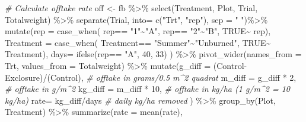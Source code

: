 \documentclass[
]{article}
\newenvironment{Shaded}{\begin{snugshade}}{\end{snugshade}}
\newcommand{\AttributeTok}[1]{\textcolor[rgb]{0.77,0.63,0.00}{#1}}
\newcommand{\CommentTok}[1]{\textcolor[rgb]{0.56,0.35,0.01}{\textit{#1}}}
\newcommand{\ConstantTok}[1]{\textcolor[rgb]{0.00,0.00,0.00}{#1}}
\newcommand{\DecValTok}[1]{\textcolor[rgb]{0.00,0.00,0.81}{#1}}
\newcommand{\FunctionTok}[1]{\textcolor[rgb]{0.00,0.00,0.00}{#1}}
\newcommand{\NormalTok}[1]{#1}
\newcommand{\OtherTok}[1]{\textcolor[rgb]{0.56,0.35,0.01}{#1}}
\newcommand{\SpecialCharTok}[1]{\textcolor[rgb]{0.00,0.00,0.00}{#1}}
\newcommand{\StringTok}[1]{\textcolor[rgb]{0.31,0.60,0.02}{#1}}
\begin{document}
\begin{Shaded}
\begin{Highlighting}[]
\CommentTok{\# Calculate offtake rate}
\NormalTok{  off }\OtherTok{\textless{}{-}} 
\NormalTok{    fb }\SpecialCharTok{\%\textgreater{}\%}
      \FunctionTok{select}\NormalTok{(Treatment, Plot, Trial, Totalweight) }\SpecialCharTok{\%\textgreater{}\%}
      \FunctionTok{separate}\NormalTok{(Trial, }\AttributeTok{into=} \FunctionTok{c}\NormalTok{(}\StringTok{"Trt"}\NormalTok{, }\StringTok{"rep"}\NormalTok{), }\AttributeTok{sep =} \StringTok{" "}\NormalTok{)}\SpecialCharTok{\%\textgreater{}\%}
      \FunctionTok{mutate}\NormalTok{(}\AttributeTok{rep =} \FunctionTok{case\_when}\NormalTok{(}
\NormalTok{        rep}\SpecialCharTok{==} \StringTok{"1"}\SpecialCharTok{\textasciitilde{}}\StringTok{"A"}\NormalTok{, }
\NormalTok{        rep}\SpecialCharTok{==} \StringTok{"2"}\SpecialCharTok{\textasciitilde{}}\StringTok{"B"}\NormalTok{,}
        \ConstantTok{TRUE}\SpecialCharTok{\textasciitilde{}}\NormalTok{ rep),}
        \AttributeTok{Treatment =} \FunctionTok{case\_when}\NormalTok{(}
\NormalTok{          Treatment}\SpecialCharTok{==} \StringTok{"Summer"}\SpecialCharTok{\textasciitilde{}}\StringTok{"Unburned"}\NormalTok{,}
          \ConstantTok{TRUE}\SpecialCharTok{\textasciitilde{}}\NormalTok{ Treatment),}
        \AttributeTok{days=} \FunctionTok{ifelse}\NormalTok{(rep}\SpecialCharTok{==} \StringTok{"A"}\NormalTok{, }\DecValTok{40}\NormalTok{, }\DecValTok{33}\NormalTok{) ) }\SpecialCharTok{\%\textgreater{}\%}
      \FunctionTok{pivot\_wider}\NormalTok{(}\AttributeTok{names\_from =}\NormalTok{ Trt, }
                  \AttributeTok{values\_from =}\NormalTok{ Totalweight) }\SpecialCharTok{\%\textgreater{}\%}
      \FunctionTok{mutate}\NormalTok{(}\AttributeTok{g\_diff =}\NormalTok{ (Control}\SpecialCharTok{{-}}\NormalTok{Exclosure)}\SpecialCharTok{/}\NormalTok{(Control), }\CommentTok{\# offtake in grams/0.5 m\^{}2 quadrat}
             \AttributeTok{m\_diff =}\NormalTok{ g\_diff }\SpecialCharTok{*} \DecValTok{2}\NormalTok{,   }\CommentTok{\# offtake in g/m\^{}2}
             \AttributeTok{kg\_diff =}\NormalTok{ m\_diff }\SpecialCharTok{*} \DecValTok{10}\NormalTok{, }\CommentTok{\# offtake in kg/ha (1 g/m\^{}2 = 10 kg/ha)}
             \AttributeTok{rate=}\NormalTok{ kg\_diff}\SpecialCharTok{/}\NormalTok{days     }\CommentTok{\# daily kg/ha removed}
\NormalTok{             ) }\SpecialCharTok{\%\textgreater{}\%}
      \FunctionTok{group\_by}\NormalTok{(Plot, Treatment) }\SpecialCharTok{\%\textgreater{}\%}
      \FunctionTok{summarize}\NormalTok{(}\AttributeTok{rate =} \FunctionTok{mean}\NormalTok{(rate),}

\end{Highlighting}
\end{Shaded}
\end{document}
